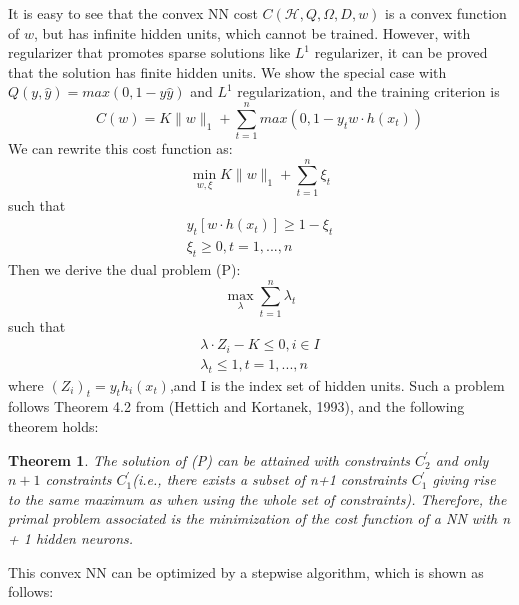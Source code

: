\documentclass{article}
\renewcommand{\algorithmicrequire}{\textbf{Input:}}
\begin{document}
It is easy to see that the convex NN cost $C(\mathcal{H}, Q, \Omega, D, w)$ is a convex function of $w$, but has infinite hidden units, which cannot be trained. However, with regularizer that promotes sparse solutions like $L^{1}$ regularizer, it can be proved that the solution has finite hidden units. We show the special case with $Q(y,\hat{y}) = max(0, 1-y\hat{y})$ and $L^{1}$ regularization, and the training criterion is 
\begin{equation}
C(w) = K\lVert w \rVert_{1} + \sum_{t=1}^{n}max(0, 1-y_{t}w\cdot h(x_{t}))
\end{equation}
We can rewrite this cost function as:
\begin{equation}
\min_{w, \xi} K \lVert w \rVert_{1} + \sum_{t=1}^{n} \xi_{t}
\end{equation}
such that
\begin{gather}
y_{t}[w\cdot h(x_{t})] \ge 1 - \xi_{t}\\
\xi_{t} \ge 0, t=1,...,n
\end{gather}
Then we derive the dual problem (P):
\begin{equation}
\max_{\lambda} \sum_{t=1}^{n} \lambda_{t}
\end{equation}
such that
\begin{gather}
\lambda \cdot Z_{i} - K \le 0, i \in I\\
\lambda_{t} \le 1, t=1,...,n
\end{gather}
where $(Z_{i})_{t}= y_{t}h_{i}(x_{t})$,and I is the index set of hidden units. Such a problem follows Theorem 4.2 from (Hettich and Kortanek, 1993), and the following theorem holds:
\newtheorem{tem}{Theorem}[section]
\begin{tem}
	The solution of (P) can be attained with constraints $C_{2}^{'}$ and only $n + 1$ constraints $C_{1}^{'}$(i.e., there exists a subset of n+1 constraints $C_{1}^{'}$ giving rise to the same maximum
	as when using the whole set of constraints). Therefore, the primal problem associated is the
	minimization of the cost function of a NN with n + 1 hidden neurons.
\end{tem}
This convex NN can be optimized by a stepwise algorithm, which is shown as follows:
\renewcommand{\algorithmicrequire}{\textbf{Input:}}
\end{document}
